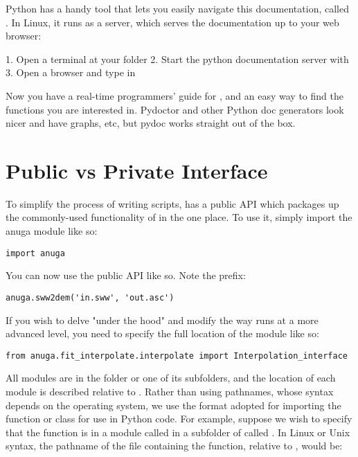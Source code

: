 \documentclass{manual}
\begin{document}
Python has a handy tool that lets you easily navigate this documentation,
called . In Linux, it runs as a server, which serves the
documentation up to your web browser:

1. Open a terminal at your  folder
2. Start the python documentation server with 
3. Open a browser and type in 

Now you have a real-time programmers' guide for \anuga, and an easy way to find
the functions you are interested in. Pydoctor and other Python doc generators
look nicer and have graphs, etc, but pydoc works straight out of the box.

\section{Public vs Private Interface}

To simplify the process of writing scripts, \anuga has a public API which packages
up the commonly-used functionality of \anuga in the one place. To use it, simply
import the anuga module like so:

\begin{verbatim}
import anuga
\end{verbatim}

You can now use the public API like so. Note the  prefix:

\begin{verbatim}
anuga.sww2dem('in.sww', 'out.asc')
\end{verbatim}

If you wish to delve "under the hood" and modify the way \anuga runs at a more
advanced level, you need to specify the full location of the module like so:

\begin{verbatim}
from anuga.fit_interpolate.interpolate import Interpolation_interface
\end{verbatim}

All modules are in the folder  or one of its subfolders, and the
location of each module is described relative to . Rather
than using pathnames, whose syntax depends on the operating system,
we use the format adopted for importing the function or class for
use in Python code. For example, suppose we wish to specify that the
function  is in a module called
 in a subfolder of  called
. In Linux or Unix syntax, the pathname of the file
containing the function, relative to , would be:
\end{document}
